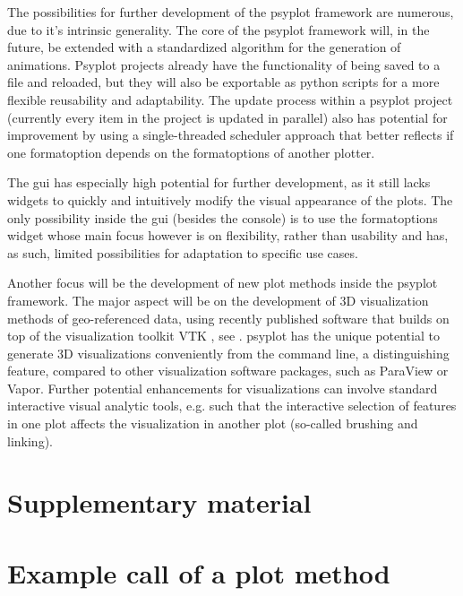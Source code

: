 \begin{refsection}
The possibilities for further development of the psyplot framework are numerous, due to it's intrinsic generality. The core of the psyplot framework will, in the future, be extended with a standardized algorithm  for the generation of animations. Psyplot projects already have the functionality of being saved to a file and reloaded, but they will also be exportable as python scripts for a more flexible reusability and adaptability. The update process within a psyplot project (currently every item in the project is updated in parallel) also has potential for improvement by using a single-threaded scheduler approach that better reflects if one formatoption depends on the formatoptions of another plotter.

The \gls{gui} has especially high potential for further development, as it still lacks widgets to quickly and intuitively modify the visual appearance of the plots. The only possibility inside the \gls{gui} (besides the console) is to use the formatoptions widget whose main focus however is on flexibility, rather than usability and has, as such, limited possibilities for adaptation to specific use cases.

Another focus will be the development of new plot methods inside the psyplot framework. The major aspect will be on the development of 3D visualization methods of geo-referenced data, using recently published software that builds on top of the visualization toolkit VTK \citep{SullivanKaszynski2019, SullivanTrainorGuitton2019}, see \cite{Sommer2019a}. psyplot has the unique potential to generate 3D visualizations conveniently from the command line, a distinguishing feature, compared to other visualization software packages, such as ParaView or Vapor. Further potential enhancements for visualizations can involve standard interactive visual analytic tools, e.g. such that the interactive selection of features in one plot affects the visualization in another plot (so-called brushing and linking).

\clearpage

\begin{subappendices}
	\section*{Supplementary material}
	\section{Example call of a plot method}  \label{sec:psyplot-example}
	

\end{subappendices}
\end{refsection}
